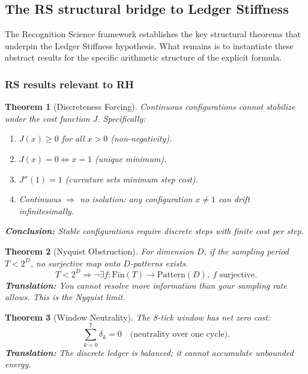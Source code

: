 \documentclass[11pt]{article}
\newtheorem{theorem}{Theorem}
\theoremstyle{definition}
\theoremstyle{remark}
\theoremstyle{definition}
\begin{document}
\subsection*{The RS structural bridge to Ledger Stiffness}\label{sec:rs-structural-bridge}

The Recognition Science framework establishes the key structural theorems that underpin the Ledger Stiffness hypothesis. What remains is to instantiate these abstract results for the specific arithmetic structure of the explicit formula.

\subsubsection*{RS results relevant to RH}

\begin{theorem}[Discreteness Forcing]\label{thm:rs-discreteness}
Continuous configurations cannot stabilize under the cost function $J$. Specifically:
\begin{enumerate}
\item $J(x) \ge 0$ for all $x > 0$ (non-negativity).
\item $J(x) = 0 \Leftrightarrow x = 1$ (unique minimum).
\item $J''(1) = 1$ (curvature sets minimum step cost).
\item Continuous $\Rightarrow$ no isolation: any configuration $x \neq 1$ can drift infinitesimally.
\end{enumerate}
\textbf{Conclusion:} Stable configurations require discrete steps with finite cost per step.
\end{theorem}

\begin{theorem}[Nyquist Obstruction]\label{thm:rs-nyquist}
For dimension $D$, if the sampling period $T < 2^D$, no surjective map onto $D$-patterns exists.
\[
  T < 2^D \Rightarrow \neg\exists f : \mathrm{Fin}(T) \to \mathrm{Pattern}(D),\ f \text{ surjective}.
\]
\textbf{Translation:} You cannot resolve more information than your sampling rate allows. This is the Nyquist limit.
\end{theorem}

\begin{theorem}[Window Neutrality]\label{thm:rs-neutrality}
The 8-tick window has net zero cost:
\[
  \sum_{k=0}^{7} \delta_k = 0 \quad \text{(neutrality over one cycle)}.
\]
\textbf{Translation:} The discrete ledger is balanced; it cannot accumulate unbounded energy.
\end{theorem}
\end{document}
